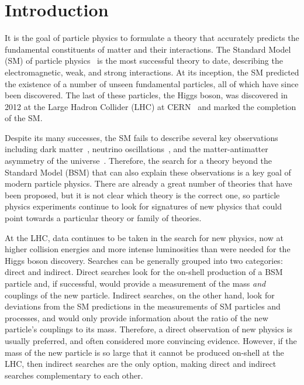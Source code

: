 \chapter{Introduction}\label{chap:intro}

It is the goal of particle physics to formulate a theory that accurately predicts the fundamental constituents of matter and their interactions. The Standard Model (SM) of particle physics~\cite{Glashow:1961tr,Weinberg:1967tq,Salam:1968rm} is the most successful theory to date, describing the electromagnetic, weak, and strong interactions. At its inception, the SM predicted the existence of a number of unseen fundamental particles, all of which have since been discovered. The last of these particles, the Higgs boson, was discovered in 2012 at the Large Hadron Collider (LHC) at CERN~\cite{CMS:2012qbp,ATLAS:2012yve} and marked the completion of the SM.  

Despite its many successes, the SM fails to describe several key observations including dark matter~\cite{Clowe:2006eq}, neutrino oscillations~\cite{Super-Kamiokande:1998kpq}, and the matter-antimatter asymmetry of the universe~\cite{Canetti:2012zc}. Therefore, the search for a theory beyond the Standard Model (BSM) that can also explain these observations is a key goal of modern particle physics. There are already a great number of theories that have been proposed, but it is not clear which theory is the correct one, so particle physics experiments continue to look for signatures of new physics that could point towards a particular theory or family of theories.

At the LHC, data continues to be taken in the search for new physics, now at higher collision energies and more intense luminosities than were needed for the Higgs boson discovery. Searches can be generally grouped into two categories: direct and indirect. Direct searches look for the on-shell production of a BSM particle and, if successful, would provide a measurement of the mass \textit{and} couplings of the new particle. Indirect searches, on the other hand, look for deviations from the SM predictions in the measurements of SM particles and processes, and would only provide information about the ratio of the new particle's couplings to its mass. Therefore, a direct observation of new physics is usually preferred, and often considered more convincing evidence. However, if the mass of the new particle is so large that it cannot be produced on-shell at the LHC, then indirect searches are the only option, making direct and indirect searches complementary to each other.

